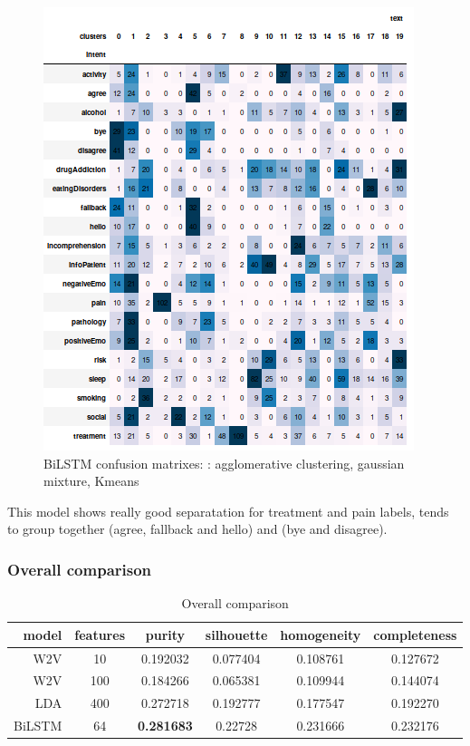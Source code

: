 \documentclass[11pt]{article}
\begin{document}
\begin{figure}[h]
	\includegraphics[scale=0.28]{bilstm_km_cm.png}
	\caption{BiLSTM confusion matrixes: : agglomerative clustering, gaussian mixture, Kmeans}
\label{lda_gm_cm}
\end{figure}
\FloatBarrier

This model shows really good separatation for treatment and pain labels, 
tends to group together (agree, fallback and hello) and (bye and disagree).

\subsubsection{Overall comparison}



\begin{table}[htb]
\begin{center}
\begin{tabular}{ |r|c|c|c|c|c| }
\hline
model & features & purity  & silhouette  & homogeneity  & completeness \\ \hline 
W2V 	& 10   & 0.192032  & 0.077404  & 0.108761  & 0.127672 \\ \hline 
W2V 	& 100  & 0.184266  & 0.065381  & 0.109944  & 0.144074 \\ \hline 
LDA 	& 400  & 0.272718  & 0.192777  & 0.177547  & 0.192270 \\ \hline 
BiLSTM 	& 64  & \textbf{0.281683}  & 0.22728  & 0.231666  & 0.232176\\ \hline 
\end{tabular}
\end{center}
\caption{Overall comparison}
\end{table}
\FloatBarrier
\end{document}
